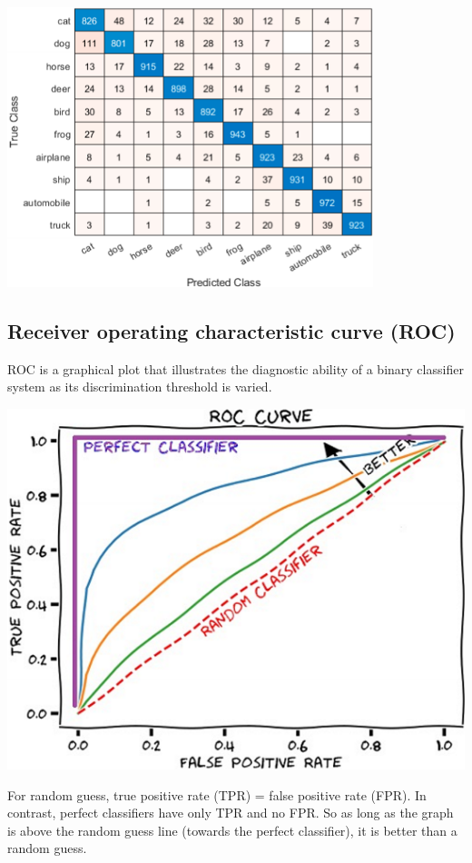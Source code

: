 \documentclass[letterpaper,12pt]{article}
\begin{document}
\includegraphics{./Image/Confusion matrix.png}

\subsection{Receiver operating characteristic curve (ROC)}

ROC is a graphical plot that illustrates the diagnostic ability of a binary
classifier system as its discrimination threshold is varied.

\includegraphics{./Image/ROC curve.png}

For random guess, true positive rate (TPR) = false positive rate (FPR). In
contrast, perfect classifiers have only TPR and no FPR. So as long as the graph
is above the random guess line (towards the perfect classifier), it is better than
a random guess.
\end{document}
